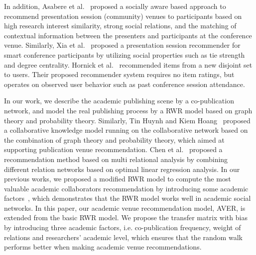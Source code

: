 \documentclass{sig-alternate-2013}
\begin{document}
In addition, Asabere et al.~\cite{asabere2014improving} proposed a socially aware based approach to recommend presentation session (community) venues to participants based on high research interest similarity, strong social relations, and the matching of contextual information between the presenters and participants at the conference venue. Similarly, Xia et al.~\cite{xia2013socially} proposed a presentation session recommender for smart conference participants by utilizing social properties such as tie strength and degree centrality. Hornick et al.~\cite{hornick2012extending} recommended items from a new disjoint set to users. Their proposed recommender system requires no item ratings, but operates on observed user behavior such as past conference session attendance.

In our work, we describe the academic publishing scene by a co-publication network, and model the real publishing process by a RWR model based on graph theory and probability theory. Similarly, Tin Huynh and Kiem Hoang~\cite{huynh2012modeling} proposed a collaborative knowledge model running on the collaborative network based on the combination of graph theory and probability theory, which aimed at supporting publication venue recommendation. Chen et al.~\cite{chen2012social} proposed a recommendation method based on multi relational analysis by combining different relation networks based on optimal linear regression analysis. In our previous works, we proposed a modified RWR model to compute the most valuable academic collaborators recommendation by introducing some academic factors~\cite{xia2014mvcwalker}, which demonstrates that the RWR model works well in academic social networks. In this paper, our academic venue recommendation model, AVER, is extended from the basic RWR model. We propose the transfer matrix with bias by introducing three academic factors, i.e. co-publication frequency, weight of relations and researchers' academic level, which ensures that the random walk performs better when making academic venue recommendations.
\end{document}
